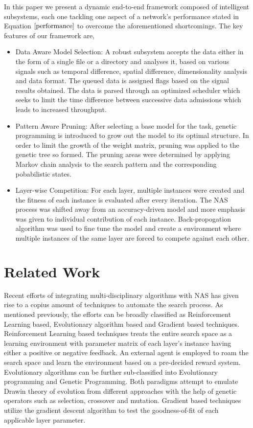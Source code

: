\documentclass[conference]{IEEEtran}
\begin{document}
In this paper we present a dynamic end-to-end framework composed of intelligent subsystems, each one tackling one aspect of a network's performance stated in Equation $\ref{performance}$ to overcome the aforementioned shortcomings. The key features of our framework are, 

\begin{itemize}
\item Data Aware Model Selection: A robust subsystem accepts the data either in the form of a single file or a directory and analyses it, based on various signals such as temporal difference, spatial difference, dimensionality analysis and data format. The queued data is assigned flags based on the signal results obtained. The data is parsed through an optimized scheduler which seeks to limit the time difference between successive data admissions which leads to increased throughput.  
\item Pattern Aware Pruning: After selecting a base model for the task, genetic programming is introduced to grow out the model to its optimal structure. In order to limit the growth of the weight matrix, pruning was applied to the genetic tree so formed. The pruning areas were determined by applying Markov chain analysis to the search pattern and the corresponding pobabilistic states. 
\item Layer-wise Competition: For each layer, multiple instances were created and the fitness of each instance is evaluated after every iteration. The NAS process was shifted away from an accuracy-driven model and more emphasis was given to individual contribution of each instance. Back-propogation algorithm was used to fine tune the model and create a environment where multiple instances of the same layer are forced to compete against each other. 
\end{itemize}

\section{Related Work}

Recent efforts of integrating multi-disciplinary algorithms with NAS has given rise to a copius amount of techniques to automate the search process. As mentioned previously, the efforts can be broadly classified as Reinforcement Learning based, Evolutionary algorithm based and Gradient based techniques. Reinforcement Learning based techniques treats the entire search space as a learning environment with parameter matrix of each layer's instance having either a positive or negative feedback. An external agent is employed to roam the search space and learn the environment based on a pre-decided reward system. Evolutionary algorithms can be further sub-classified into Evolutionary programming and Genetic Programming. Both paradigms attempt to emulate Drawin theory of evolution from different approaches with the help of genetic operators such as selection, crossover and mutation. Gradient based techniques utilize the gradient descent algorithm to test the goodness-of-fit of each applicable layer parameter.  
\end{document}
